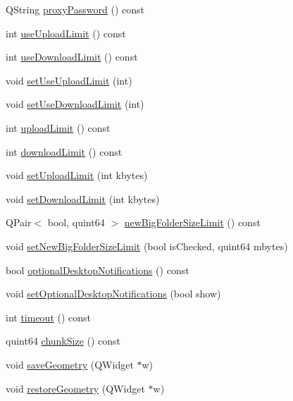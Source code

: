 \begin{DoxyCompactItemize}
Q\+String \hyperlink{class_o_c_c_1_1_config_file_a28f1c55f9d8c183075936055bbeadb4b}{proxy\+Password} () const
\item 
int \hyperlink{class_o_c_c_1_1_config_file_a448af0807e52e830d4964481054b2e97}{use\+Upload\+Limit} () const
\item 
int \hyperlink{class_o_c_c_1_1_config_file_a08c88fb88637d43c1f26945057fc7ed3}{use\+Download\+Limit} () const
\item 
void \hyperlink{class_o_c_c_1_1_config_file_ae2c9c8aedf58603117741c6fb57f73be}{set\+Use\+Upload\+Limit} (int)
\item 
void \hyperlink{class_o_c_c_1_1_config_file_a4e2e992fdd9d9a0888920d9a903fa0a9}{set\+Use\+Download\+Limit} (int)
\item 
int \hyperlink{class_o_c_c_1_1_config_file_a6aa3c9110938a7c986ffccadfbbd4e77}{upload\+Limit} () const
\item 
int \hyperlink{class_o_c_c_1_1_config_file_a06569c093c116eb187791d9f3a63fb75}{download\+Limit} () const
\item 
void \hyperlink{class_o_c_c_1_1_config_file_af2f80bed9cf14242986ea8d9275617b7}{set\+Upload\+Limit} (int kbytes)
\item 
void \hyperlink{class_o_c_c_1_1_config_file_a5bdc547541af13d0aa75564881f3c558}{set\+Download\+Limit} (int kbytes)
\item 
Q\+Pair$<$ bool, quint64 $>$ \hyperlink{class_o_c_c_1_1_config_file_a43b6b028681c10e738472cb86b386b1e}{new\+Big\+Folder\+Size\+Limit} () const
\item 
void \hyperlink{class_o_c_c_1_1_config_file_a08627662f108b24dfb9cad7234adc289}{set\+New\+Big\+Folder\+Size\+Limit} (bool is\+Checked, quint64 mbytes)
\item 
bool \hyperlink{class_o_c_c_1_1_config_file_aedf98a5dab35cf6fc5d8232445c9e562}{optional\+Desktop\+Notifications} () const
\item 
void \hyperlink{class_o_c_c_1_1_config_file_a8fad94a84f8e74536b6369de250fa7ca}{set\+Optional\+Desktop\+Notifications} (bool show)
\item 
int \hyperlink{class_o_c_c_1_1_config_file_af928f35bde0a2f088dbfa56bebe5aae4}{timeout} () const
\item 
quint64 \hyperlink{class_o_c_c_1_1_config_file_a53a466f9bb98b7bb5f6a4a8fff44489f}{chunk\+Size} () const
\item 
void \hyperlink{class_o_c_c_1_1_config_file_a82d9bef1bf904bb17f7f59607395195f}{save\+Geometry} (Q\+Widget $\ast$w)
\item 
void \hyperlink{class_o_c_c_1_1_config_file_a99af813ce61add8d2b12c79d02193702}{restore\+Geometry} (Q\+Widget $\ast$w)

\end{DoxyCompactItemize}
